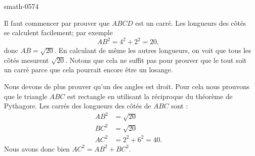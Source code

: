 
\begin{corrige}{smath-0574}

    Il faut commencer par prouver que \( ABCD\) est un carré. Les longueurs des côtés se calculent facilement; par exemple
    \begin{equation}
        AB^2=4^2+2^2=20,
    \end{equation}
    donc \( AB=\sqrt{20}\). En calculant de même les autres longueurs, on voit que tous les côtés mesurent \( \sqrt{20}\). Notons que cela ne suffit pas pour prouver que le tout soit un carré parce que cela pourrait encore être un losange. 
    
    Nous devons de plus prouver qu'un des angles est droit. Pour cela nous prouvons que le triangle \( ABC\) est rectangle en utilisant la réciproque du théorème de Pythagore. Les carrés des longueurs des côtés de \( ABC\) sont :
    \begin{subequations}
        \begin{align}
            AB^2&=\sqrt{20}\\
            BC^2&=\sqrt{20}\\
            AC^2&=2^2+6^2=40.
        \end{align}
    \end{subequations}
    Nous avons donc bien \( AC^2=AB^2+BC^2\).

\end{corrige}
